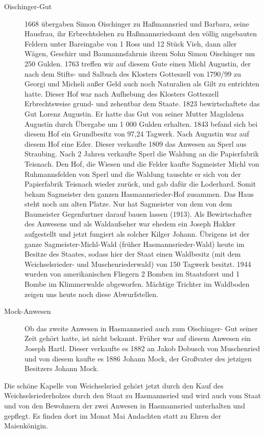 \documentclass[12pt,a4pager,draft]{book}
\begin{document}
\begin{description}
\item[Oischinger-Gut] 1668 übergaben Simon Oischinger zu Haßmannsried und
Barbara, seine Hausfrau, ihr Erbrechtslehen zu Haßmannsriedsamt den völlig
angebauten Feldern unter Bareingabe von 1 Ross und 12 Stück Vieh, dann aller
Wägen, Geschirr und Baumannsfahrnis ihrem Sohn Simon Oischinger um 250 Gulden.
1763 treffen wir auf diesem Gute einen Michl Augustin, der nach dem Stifts- und
Salbuch des Klosters Gotteszell von 1790/99 zu Georgi und Micheli außer Geld
auch noch Naturalien als Gilt zu entrichten hatte. Dieser Hof war nach Aufhebung
des Klosters Gotteszell Erbrechtsweise grund- und zehentbar dem Staate. 1823
bewirtschaftete das Gut Lorenz Augustin. Er hatte das Gut von seiner Mutter
Magdalena Augustin durch Übergabe um 1 000 Gulden erhalten. 1843 befand sich bei
diesem Hof ein Grundbesitz von 97,24 Tagwerk. Nach Augustin war auf diesem Hof
eine Eder. Dieser verkaufte 1809 das Anwesen an Sperl aus Straubing. Nach 2
Jahren verkaufte Sperl die Waldung an die Papierfabrik Teisnach. Den Hof, die
Wiesen und die Felder kaufte Sagmeister Michl von Ruhmannsfelden von Sperl und
die Waldung tauschte er sich von der Papierfabrik Teisnach wieder zurück, und
gab dafür die Loderhard. Somit bekam Sagmeister den ganzen Hasmannsrieder-Hof
zusammen. Das Haus steht noch am alten Platze. Nur hat Sagmeister von dem von
dem Baumeister Gegenfurtner darauf bauen lassen (1913). Als Bewirtschafter des
Anwesens und als Waldaufseher war ehedem ein Joseph Hakker aufgestellt und jetzt
fungiert als solcher Kilger Johann. Übrigens ist der ganze Sagmeister-Michl-Wald
(früher Hasmannsrieder-Wald) heute im Besitze des Staates, sodass hier der Staat
einen Waldbesitz (mit dem Weichselsrieder- und Muschenriederwald) von 150
Tagwerk besitzt. 1944 wurden von amerikanischen Fliegern 2 Bomben im Staatsforst
und 1 Bombe im Klimmerwalde abgeworfen. Mächtige Trichter im Waldboden zeigen
uns heute noch diese Abwurfstellen.

\item[Mock-Anwesen] Ob das zweite Anwesen in Hasmannsried auch zum Oischinger-
Gut seiner Zeit gehört hatte, ist nicht bekannt. Früher war auf diesem Anwesen
ein Joseph Hartl. Dieser verkaufte es 1882 an Jakob Dobusch von Muschenried und
von diesem kaufte es 1886 Johann Mock, der Großvater des jetzigen Besitzers
Johann Mock.
\end{description}

Die schöne Kapelle von Weichselsried gehört jetzt durch den Kauf des
Weichselsriederholzes durch den Staat zu Hasmannsried und wird auch vom Staat
und von den Bewohnern der zwei Anwesen in Hasmannsried unterhalten und gepflegt.
Es finden dort im Monat Mai Andachten statt zu Ehren der Maienkönigin.
\end{document}
